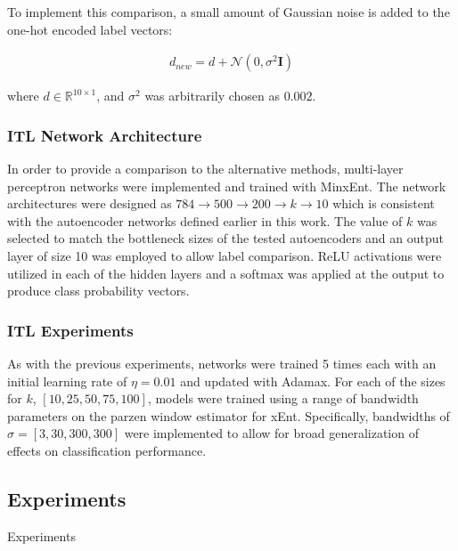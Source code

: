 \documentclass[conference]{IEEEtran}
\begin{document}
	 \noindent To implement this comparison, a small amount of Gaussian noise is added to the one-hot encoded label vectors:
	 
	 \begin{align}
	 	d_{new} = d + \mathcal{N}(0,\sigma^2\mathbf{I})
	 \end{align}
	 
	 \noindent where $d\in\mathbb{R}^{10\times1}$, and $\sigma^2$ was arbitrarily chosen as $0.002$.
	 
	 \subsubsection*{ITL Network Architecture}
	 In order to provide a comparison to the alternative methods, multi-layer perceptron networks were implemented and trained with MinxEnt.  The network architectures were designed as $784 \rightarrow 500 \rightarrow 200 \rightarrow k \rightarrow 10$ which is consistent with the autoencoder networks defined earlier in this work.  The value of $k$ was selected to match the bottleneck sizes of the tested autoencoders and an output layer of size 10 was employed to allow label comparison.  ReLU activations were utilized in each of the hidden layers and a softmax was applied at the output to produce class probability vectors.
	 
	 \subsubsection*{ITL Experiments}
	 As with the previous experiments, networks were trained 5 times each with an initial learning rate of $\eta=0.01$ and updated with Adamax.  For each of the sizes for $k$, $[10,25,50,75,100]$, models were trained using a range of bandwidth parameters on the parzen window estimator for xEnt.  Specifically, bandwidths of $\sigma = [3,30,300,300]$ were implemented to allow for broad generalization of effects on classification performance.
	 
	 
	 
\subsection{Experiments} \label{Experiments}
Experiments 
\end{document}
